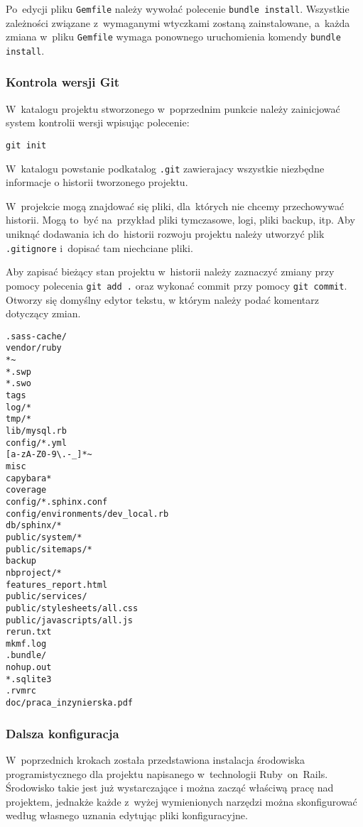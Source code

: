 Po~edycji pliku \texttt{Gemfile} należy wywołać polecenie \texttt{bundle install}. Wszystkie zależności związane z~wymaganymi wtyczkami zostaną zainstalowane, a~każda zmiana w~pliku \texttt{Gemfile} wymaga ponownego uruchomienia komendy \texttt{bundle install}.

\subsubsection{Kontrola wersji Git}

W~katalogu projektu stworzonego w~poprzednim punkcie należy zainicjować system kontrolii wersji wpisując polecenie:


\texttt{git init}


W~katalogu powstanie podkatalog \texttt{.git} zawierajacy wszystkie niezbędne informacje o historii tworzonego projektu.


W~projekcie mogą znajdować się pliki, dla~których nie chcemy przechowywać historii. Mogą to~być na~przykład pliki tymczasowe, logi, pliki backup, itp. Aby uniknąć dodawania ich do~historii rozwoju projektu należy utworzyć plik \texttt{.gitignore} i~dopisać tam niechciane pliki.


Aby zapisać bieżący stan projektu w~historii należy zaznaczyć zmiany przy pomocy polecenia \texttt{git add .} oraz wykonać commit przy pomocy \texttt{git commit}. Otworzy się domyślny edytor tekstu, w którym należy podać komentarz dotyczący zmian.

 \label{code.railsdir}
\begin{lstlisting}
.sass-cache/
vendor/ruby
*~
*.swp
*.swo
tags
log/*
tmp/*
lib/mysql.rb
config/*.yml
[a-zA-Z0-9\.-_]*~
misc
capybara*
coverage
config/*.sphinx.conf
config/environments/dev_local.rb
db/sphinx/*
public/system/*
public/sitemaps/*
backup
nbproject/*
features_report.html
public/services/
public/stylesheets/all.css
public/javascripts/all.js
rerun.txt
mkmf.log
.bundle/
nohup.out
*.sqlite3
.rvmrc
doc/praca_inzynierska.pdf
\end{lstlisting}

\subsubsection{Dalsza konfiguracja}

W~poprzednich krokach została przedstawiona instalacja środowiska programistycznego dla projektu napisanego w~technologii Ruby~on~Rails. Środowisko takie jest już wystarczające i można zacząć właściwą pracę nad projektem, jednakże każde z~wyżej wymienionych narzędzi można skonfigurować według własnego uznania edytując pliki konfiguracyjne.


